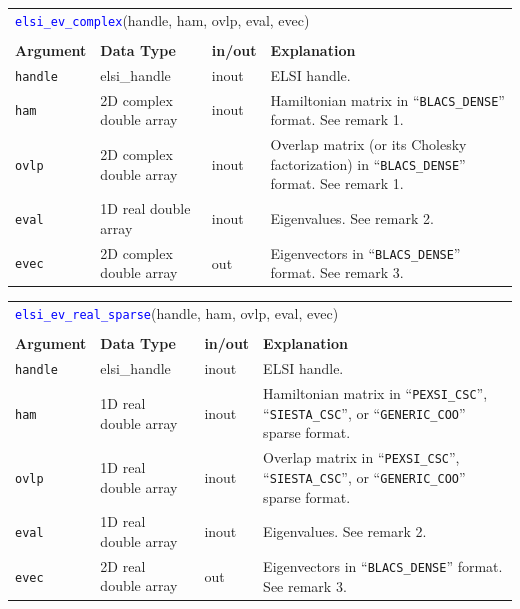 \documentclass{report}
\newcommand{\api}[1]{\textcolor{blue}{\texttt{#1}}}
\begin{document}
\begin{tabular}[]{|p{20mm}|p{40mm}|p{10mm}|p{92mm}|}
\multicolumn{4}{l}{\api{elsi\_ev\_complex}(handle, ham, ovlp, eval, evec)}\\
\multicolumn{4}{l}{}\\
\hline
\multicolumn{1}{|l|}{\textbf{Argument}} & \multicolumn{1}{l|}{\textbf{Data Type}} & \multicolumn{1}{l|}{\textbf{in/out}} & \multicolumn{1}{l|}{\textbf{Explanation}}\\
\hline
\texttt{handle} & elsi\_handle            & inout & ELSI handle.\\
\hline
\texttt{ham}    & 2D complex double array & inout & Hamiltonian matrix in ``\texttt{BLACS\_DENSE}'' format. See remark 1.\\
\hline
\texttt{ovlp}   & 2D complex double array & inout & Overlap matrix (or its Cholesky factorization) in ``\texttt{BLACS\_DENSE}'' format. See remark 1.\\
\hline
\texttt{eval}   & 1D real double array    & inout & Eigenvalues. See remark 2.\\
\hline
\texttt{evec}   & 2D complex double array & out   & Eigenvectors in ``\texttt{BLACS\_DENSE}'' format. See remark 3.\\
\hline
\end{tabular}

\begin{tabular}[]{|p{20mm}|p{40mm}|p{10mm}|p{92mm}|}
\multicolumn{4}{l}{\api{elsi\_ev\_real\_sparse}(handle, ham, ovlp, eval, evec)}\\
\multicolumn{4}{l}{}\\
\hline
\multicolumn{1}{|l|}{\textbf{Argument}} & \multicolumn{1}{l|}{\textbf{Data Type}} & \multicolumn{1}{l|}{\textbf{in/out}} & \multicolumn{1}{l|}{\textbf{Explanation}}\\
\hline
\texttt{handle} & elsi\_handle         & inout & ELSI handle.\\
\hline
\texttt{ham}    & 1D real double array & inout & Hamiltonian matrix in ``\texttt{PEXSI\_CSC}'', ``\texttt{SIESTA\_CSC}'', or ``\texttt{GENERIC\_COO}'' sparse format.\\
\hline
\texttt{ovlp}   & 1D real double array & inout & Overlap matrix in ``\texttt{PEXSI\_CSC}'', ``\texttt{SIESTA\_CSC}'', or ``\texttt{GENERIC\_COO}'' sparse format.\\
\hline
\texttt{eval}   & 1D real double array & inout & Eigenvalues. See remark 2.\\
\hline
\texttt{evec}   & 2D real double array & out   & Eigenvectors in ``\texttt{BLACS\_DENSE}'' format. See remark 3.\\
\hline
\end{tabular}
\end{document}
